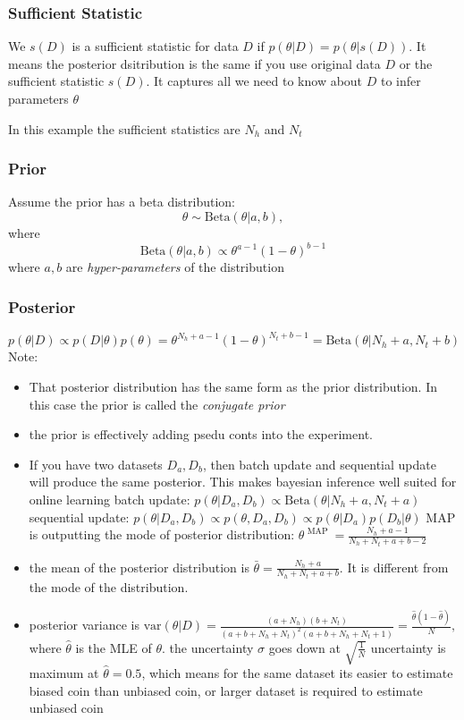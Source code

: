 \documentclass[11pt]{article}
\begin{document}
\subsubsection{Sufficient Statistic}
We $s(D)$ is a sufficient statistic for data $D$ if $p(\theta|D)=p(\theta|s(D))$. It means the posterior dsitribution is the same if you use original data $D$ or the sufficient statistic $s(D)$. It captures all we need to know about $D$ to infer parameters $\theta$

In this example the sufficient statistics are $N_h$ and $N_t$

\subsubsection{Prior}
Assume the prior has a beta distribution:
\[
\theta \sim \mathrm{Beta}(\theta|a,b),
\]
where
\[
\mathrm{Beta}(\theta|a,b) \propto \theta^{a-1}(1-\theta)^{b-1}
\]
where $a,b$ are \emph{hyper-parameters} of the distribution

\subsubsection{Posterior}
\[
p(\theta|D) \propto p(D|\theta)p(\theta) = \theta^{N_h+a-1}(1-\theta)^{N_t+b-1} = \mathrm{Beta}(\theta|N_h+a,N_t+b)
\]
Note:
\begin{itemize}
\item That posterior distribution has the same form as the prior distribution. In this case the prior is called the \emph{conjugate prior}
\item the prior is effectively adding psedu conts into the experiment.
\item If you have two datasets $D_a,D_b$, then batch update and sequential update will produce the same posterior. This makes bayesian inference well suited for online learning
\subitem batch update: $p(\theta|D_a,D_b) \propto \mathrm{Beta}(\theta|N_h+a,N_t+a)$
\subitem sequential update: $p(\theta|D_a,D_b) \propto p(\theta,D_a,D_b) \propto p(\theta|D_a)p(D_b|\theta)$
\subitem MAP is outputting the mode of posterior distribution: $\theta^{\mbox{ MAP }} = \frac{N_h+a-1}{N_h+N_t+a+b-2}$
\item the mean of the posterior distribution is $\bar{\theta} = \frac{N_h+a}{N_h+N_t+a+b}$. It is different from the mode of the distribution.
\item posterior variance is $\mathrm{var}(\theta|D) = \frac{(a+N_h)(b+N_t)}{(a+b+N_h+N_t)^2(a+b+N_h+N_t+1)} = \frac{\hat\theta(1- \hat\theta)}{N},$ where $\hat\theta$ is the MLE of $\theta$. 
\subitem the uncertainty $\sigma$ goes down at $\sqrt{\frac{1}{N}}$
\subitem uncertainty is maximum at $\hat\theta = 0.5$, which means for the same dataset its easier to estimate biased coin than unbiased coin, or larger dataset is required to estimate unbiased coin
\end{itemize}
\end{document}

